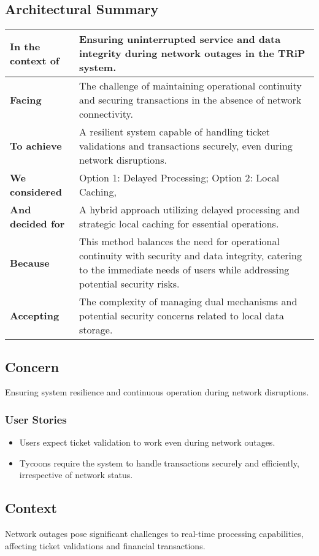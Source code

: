 \subsection*{Architectural Summary}
\begin{tabular}{|p{3.5cm}|p{10.5cm}|}
    \hline
    \textbf{In the context of} & Ensuring uninterrupted service and data integrity during network outages in the TRiP system. \\
    \hline
    \textbf{Facing} & The challenge of maintaining operational continuity and securing transactions in the absence of network connectivity. \\
    \hline
    \textbf{To achieve} & A resilient system capable of handling ticket validations and transactions securely, even during network disruptions. \\
    \hline
    \textbf{We considered} & Option 1: Delayed Processing; Option 2: Local Caching, \\
    \hline
    \textbf{And decided for} & A hybrid approach utilizing delayed processing and strategic local caching for essential operations. \\
    \hline
    \textbf{Because} & This method balances the need for operational continuity with security and data integrity, catering to the immediate needs of users while addressing potential security risks. \\
    \hline
    \textbf{Accepting} & The complexity of managing dual mechanisms and potential security concerns related to local data storage. \\
    \hline
\end{tabular}

\subsection*{Concern}
Ensuring system resilience and continuous operation during network disruptions.
\subsubsection*{User Stories}
\begin{itemize}
    \item Users expect ticket validation to work even during network outages.
    \item Tycoons require the system to handle transactions securely and efficiently, irrespective of network status.
\end{itemize}

\subsection*{Context}
Network outages pose significant challenges to real-time processing capabilities, affecting ticket validations and financial transactions.

